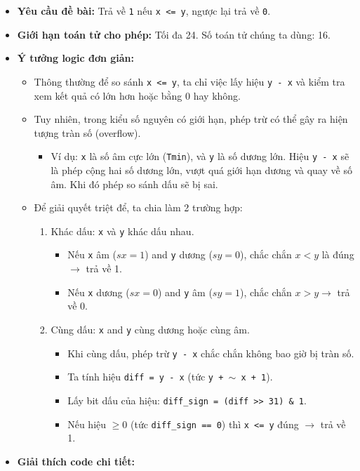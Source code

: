 \documentclass[12pt, a4paper]{article}
\begin{document}
\begin{itemize}
    \item \textbf{Yêu cầu đề bài:} Trả về \texttt{1} nếu \texttt{x <= y}, ngược lại trả về \texttt{0}.
    \item \textbf{Giới hạn toán tử cho phép:} Tối đa 24. Số toán tử chúng ta dùng: 16.
    \item \textbf{Ý tưởng logic đơn giản:}
    \begin{itemize}
        \item Thông thường để so sánh \texttt{x <= y}, ta chỉ việc lấy hiệu \texttt{y - x} và kiểm tra xem kết quả có lớn hơn hoặc bằng 0 hay không.
        \item Tuy nhiên, trong kiểu số nguyên có giới hạn, phép trừ có thể gây ra hiện tượng tràn số (overflow).
        \begin{itemize}
            \item Ví dụ: \texttt{x} là số âm cực lớn (\texttt{Tmin}), và \texttt{y} là số dương lớn. Hiệu \texttt{y - x} sẽ là phép cộng hai số dương lớn, vượt quá giới hạn dương và quay về số âm. Khi đó phép so sánh dấu sẽ bị sai.
        \end{itemize}
        \item Để giải quyết triệt để, ta chia làm 2 trường hợp:
        \begin{enumerate}
            \item Khác dấu: \texttt{x} và \texttt{y} khác dấu nhau.
            \begin{itemize}
                \item Nếu \texttt{x} âm ($sx = 1$) and \texttt{y} dương ($sy = 0$), chắc chắn $x < y$ là đúng $\rightarrow$ trả về 1.
                \item Nếu \texttt{x} dương ($sx = 0$) and \texttt{y} âm ($sy = 1$), chắc chắn $x > y \rightarrow$ trả về 0.
            \end{itemize}
            \item Cùng dấu: \texttt{x} and \texttt{y} cùng dương hoặc cùng âm.
            \begin{itemize}
                \item Khi cùng dấu, phép trừ \texttt{y - x} chắc chắn không bao giờ bị tràn số.
                \item Ta tính hiệu \texttt{diff = y - x} (tức \texttt{y + \(\sim\) x + 1}).
                \item Lấy bit dấu của hiệu: \texttt{diff\_sign = (diff >> 31) \& 1}.
                \item Nếu hiệu $\ge 0$ (tức \texttt{diff\_sign == 0}) thì \texttt{x <= y} đúng $\rightarrow$ trả về 1.
            \end{itemize}
        \end{enumerate}
    \end{itemize}
    \item \textbf{Giải thích code chi tiết:}



\end{itemize}
\end{document}
